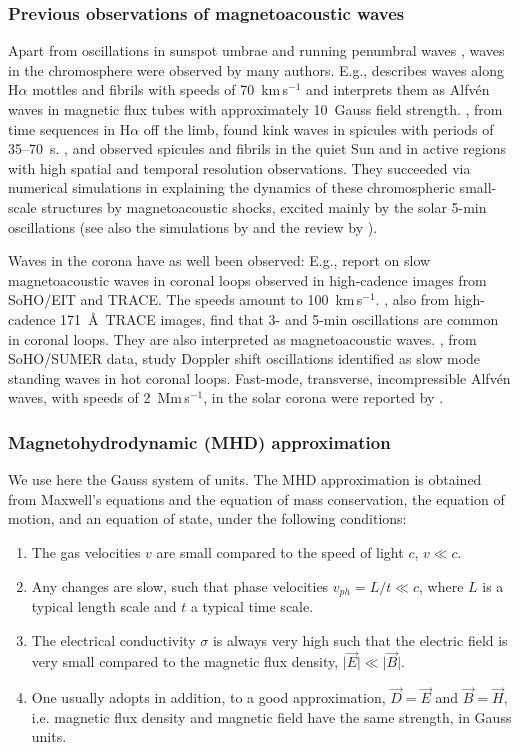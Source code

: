 \subsubsection*{Previous observations of magnetoacoustic waves}
Apart from oscillations in sunspot umbrae \citep{beckers69,wittmann69} and
running penumbral waves \citep[e.g.,][and references therein]{uexkuell83},
waves in the chromosphere were observed by many authors. E.g.,
\citet{1975SoPh...44..299G} describes waves along H$\alpha$ mottles and fibrils with
speeds of 70~km\,s$^{-1}$ and interprets them as Alfv\'en waves in magnetic
flux tubes with approximately 10~Gauss field strength. \citet{2006A&A...449L..35K},
from time sequences in H$\alpha$ off the limb, found kink waves in spicules
with periods of 35--70~s. \citet{hansteen06}, and \citet{rouppe07} observed
spicules and fibrils in the quiet Sun and in active regions with high spatial
and temporal resolution observations. They succeeded via numerical simulations
in explaining the dynamics of these chromospheric small-scale structures by
magnetoacoustic shocks, excited mainly by the solar 5-min {oscillations}
(see also the simulations by \citealt{1989ApJ...343..985S} and the review by \citealt{carlsson05}). 

Waves in the corona have as well been observed: E.g., \citet{robbrecht01} report on slow magnetoacoustic waves in coronal loops observed in high-cadence images from SoHO/EIT and TRACE. The speeds amount to 100~km\,s$^{-1}$. \citet{2002A&A...387L..13D}, also from high-cadence 171~\AA\ TRACE images, find that 3- and 5-min oscillations are common in coronal loops. They are also interpreted as magnetoacoustic waves. \citet{2007msfa.conf..265T}, from SoHO/SUMER data, study Doppler shift oscillations identified as slow mode standing waves in hot coronal loops. Fast-mode, transverse, incompressible Alfv\'en waves, with speeds of 2~Mm\,s$^{-1}$, in the solar corona were reported by \citet{2007Sci...317.1192T}.

\subsubsection*{Magnetohydrodynamic (MHD) approximation}
We use here the Gauss system of units. The MHD approximation is obtained from Maxwell's equations and the equation of mass conservation, the equation of motion, and an equation of state, under the following conditions:
%
\begin{enumerate}
\item
The gas velocities $v$ are small compared to the speed of light $c$, $v\ll c$.
\item
Any changes are slow, such that phase velocities $v_{ph}=L/t\ll c$, where $L$ is a typical length scale and $t$ a typical time scale.
\item
The electrical conductivity $\sigma$ is always very high such that the electric field is very small compared to the magnetic flux density, $\vert\vec E\vert\ll\vert\vec B\vert$. 
\item
One usually adopts in addition, to a good approximation, $\vec D=\vec E$ and $\vec B=\vec H$, i.e. magnetic flux density and magnetic field have the same strength, in Gauss units.
\end{enumerate}

